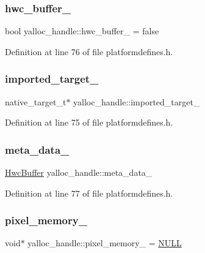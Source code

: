 \subsubsection{\texorpdfstring{hwc\+\_\+buffer\+\_\+}{hwc\_buffer\_}}
{\footnotesize\ttfamily bool yalloc\+\_\+handle\+::hwc\+\_\+buffer\+\_\+ = false}



Definition at line 76 of file platformdefines.\+h.

\mbox{\label{structyalloc__handle_a3f3364ba0854ad9263dd49bb7f121053}} 
\subsubsection{\texorpdfstring{imported\+\_\+target\+\_\+}{imported\_target\_}}
{\footnotesize\ttfamily native\+\_\+target\+\_\+t$\ast$ yalloc\+\_\+handle\+::imported\+\_\+target\+\_\+}



Definition at line 75 of file platformdefines.\+h.

\mbox{\label{structyalloc__handle_a2dfa4e2505a052e5ddbbe66e32b33875}} 
\subsubsection{\texorpdfstring{meta\+\_\+data\+\_\+}{meta\_data\_}}
{\footnotesize\ttfamily \mbox{\hyperlink{structHwcBuffer}{Hwc\+Buffer}} yalloc\+\_\+handle\+::meta\+\_\+data\+\_\+}



Definition at line 77 of file platformdefines.\+h.

\mbox{\label{structyalloc__handle_acd0886fed443ff0a5c5b3f5e471d0461}} 
\subsubsection{\texorpdfstring{pixel\+\_\+memory\+\_\+}{pixel\_memory\_}}
{\footnotesize\ttfamily void$\ast$ yalloc\+\_\+handle\+::pixel\+\_\+memory\+\_\+ = \mbox{\hyperlink{alios_2platformdefines_8h_a070d2ce7b6bb7e5c05602aa8c308d0c4}{N\+U\+LL}}}



